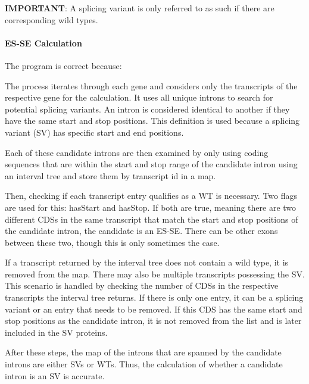 \documentclass{article}
\begin{document}
    \textbf{IMPORTANT}: A splicing variant is only referred to as such if there are corresponding wild types.

    \paragraph{ES-SE Calculation}
    The program is correct because:

    The process iterates through each gene and considers only the transcripts of the respective gene for the calculation. It uses all unique introns to search for potential splicing variants. An intron is considered identical to another if they have the same start and stop positions. This definition is used because a splicing variant (SV) has specific start and end positions.

    Each of these candidate introns are then examined by only using coding sequences that are within the start and stop range of the candidate intron using an interval tree and store them by transcript id in a map.

    Then, checking if each transcript entry qualifies as a WT is necessary. Two flags are used for this: hasStart and hasStop. If both are true, meaning there are two different CDSs in the same transcript that match the start and stop positions of the candidate intron, the candidate is an ES-SE. There can be other exons between these two, though this is only sometimes the case.

    If a transcript returned by the interval tree does not contain a wild type, it is removed from the map. There may also be multiple transcripts possessing the SV. This scenario is handled by checking the number of CDSs in the respective transcripts the interval tree returns. If there is only one entry, it can be a splicing variant or an entry that needs to be removed. If this CDS has the same start and stop positions as the candidate intron, it is not removed from the list and is later included in the SV proteins.

    After these steps, the map of the introns that are spanned by the candidate introns are either SVs or WTs. Thus, the calculation of whether a candidate intron is an SV is accurate.
\end{document}

